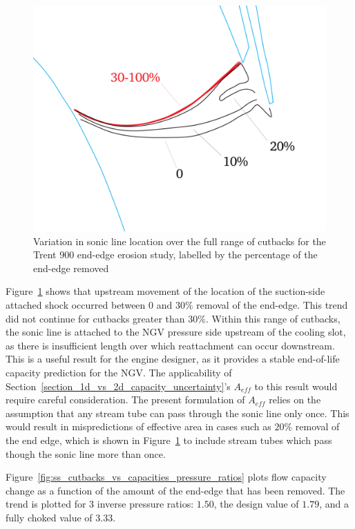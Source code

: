 \documentclass[a4paper, 11pt, oneside]{report}
\begin{document}
\begin{figure}[H]
      \centering
      \includegraphics[width=.7\textwidth]{figs/ss_cutbacks_m1_lines_illustration.png}
      \caption{Variation in sonic line location over the full range of cutbacks for the Trent 900 end-edge erosion study, labelled by the percentage of the end-edge removed}
      \label{fig:ss_cutbacks_m1_lines_illustration}
\end{figure}

Figure~\ref{fig:ss_cutbacks_m1_lines_illustration} shows that upstream movement of the location of the suction-side attached shock occurred between $0$ and $30\%$ removal of the end-edge. This trend did not continue for cutbacks greater than $30\%$. Within this range of cutbacks, the sonic line is attached to the NGV pressure side upstream of the cooling slot, as there is insufficient length over which reattachment can occur downstream. This is a useful result for the engine designer, as it provides a stable end-of-life capacity prediction for the NGV. The applicability of Section~\ref{section_1d_vs_2d_capacity_uncertainty}'s $A_{eff}$ to this result would require careful consideration. The present formulation of $A_{eff}$ relies on the assumption that any stream tube can pass through the sonic line only once. This would result in mispredictions of effective area in cases such as $20\%$ removal of the end edge, which is shown in Figure~\ref{fig:ss_cutbacks_m1_lines_illustration} to include stream tubes which pass though the sonic line more than once.

Figure~\ref{fig:ss_cutbacks_vs_capacities_pressure_ratios} plots flow capacity change as a function of the amount of the end-edge that has been removed. The trend is plotted for 3 inverse pressure ratios: $1.50$, the design value of $1.79$, and a fully choked value of $3.33$.
\end{document}
